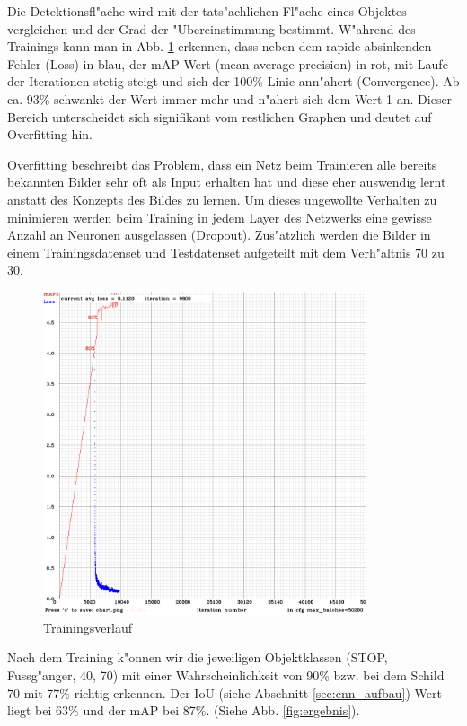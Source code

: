Die Detektionsfl"ache wird mit der tats"achlichen Fl"ache eines Objektes vergleichen und der Grad der "Ubereinstimmung bestimmt. W"ahrend des Trainings kann man in Abb. \ref{fig:training} erkennen, dass neben dem rapide absinkenden Fehler (Loss) in blau, der mAP-Wert (mean average precision) in rot, mit Laufe der Iterationen stetig steigt und sich der 100\% Linie ann"ahert (Convergence). Ab ca. 93\% schwankt der Wert immer mehr und n"ahert sich dem Wert 1 an. Dieser Bereich unterscheidet sich signifikant vom restlichen Graphen und deutet auf Overfitting hin.

Overfitting beschreibt das Problem, dass ein Netz beim Trainieren alle bereits bekannten Bilder sehr oft als Input erhalten hat und diese eher auswendig lernt anstatt des Konzepts des Bildes zu lernen. Um dieses ungewollte Verhalten zu minimieren werden beim Training in jedem Layer des Netzwerks eine gewisse Anzahl an Neuronen ausgelassen (Dropout). Zus"atzlich werden die Bilder in einem Trainingsdatenset und Testdatenset aufgeteilt mit dem Verh"altnis 70 zu 30.

\begin{figure}[h]
	\centering
	\includegraphics[width=0.85\textwidth]{images/training}
	\caption{Trainingsverlauf}
	\label{fig:training}
\end{figure}

Nach dem Training k"onnen wir die jeweiligen Objektklassen (STOP, Fussg"anger, 40, 70) mit einer Wahrscheinlichkeit von 90\% bzw. bei dem Schild 70 mit 77\% richtig erkennen. Der IoU (siehe Abschnitt \ref{sec:cnn_aufbau}) Wert liegt bei 63\% und der mAP bei 87\%. (Siehe Abb. \ref{fig:ergebnis}).

